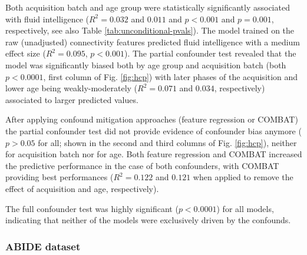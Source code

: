 \documentclass{article}
\begin{document}
Both acquisition batch and age group were statistically significantly associated with fluid intelligence ($R^2=0.032$ and $0.011$ and $p<0.001$ and $p=0.001$, respectively, see also Table \ref{tab:unconditional-pvals}). The model trained on the raw (unadjusted) connectivity features predicted fluid intelligence with a medium effect size ($R^2=0.095$, $p<0.001$).
The partial confounder test revealed that the model was significantly biased both by age group and acquisition batch (both $p<0.0001$, first column of Fig. \ref{fig:hcp}) with later phases of the acquisition and lower age being weakly-moderately ($R^2=0.071$ and $0.034$, respectively) associated to larger predicted values.

After applying confound mitigation approaches (feature regression or COMBAT) the partial confounder test did not provide evidence of confounder bias anymore ($p > 0.05$ for all; shown in the second and third columns of Fig. \ref{fig:hcp}), neither for acquisition batch nor for age. Both feature regression and COMBAT increased the predictive performance in the case of both confounders, with COMBAT providing best performances ($R^2=0.122$ and $0.121$ when applied to remove the effect of acquisition and age, respectively).

The full confounder test was highly significant ($p<0.0001$) for all models, indicating that neither of the models were exclusively driven by the confounds.

\subsubsection*{ABIDE dataset}
\end{document}
